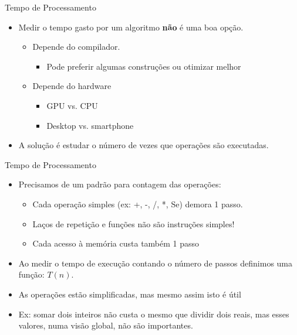 \documentclass[aspectratio=169]{beamer}
\begin{document}

\begin{frame}{Tempo de Processamento}
\begin{itemize}
\item Medir o tempo gasto por um algoritmo {\bf não} é uma boa opção.
\begin{itemize}
\item Depende do compilador. 
\begin{itemize}
\item Pode preferir algumas construções ou otimizar melhor
\end{itemize}
\item Depende do hardware
\begin{itemize}
\item GPU vs. CPU
\item Desktop vs. smartphone
\end{itemize}
\end{itemize}
\item A solução é estudar o número de vezes que operações são executadas.
\end{itemize}
\end{frame}


\begin{frame}{Tempo de Processamento}
\begin{itemize}
\item Precisamos de um padrão para contagem das operações:
\begin{itemize}
\item Cada operação simples (ex: +, -, /, *, Se) demora 1 passo.
\item Laços de repetição e funções não são instruções simples!
\item Cada acesso à memória custa também 1 passo
\end{itemize}
\item Ao medir o tempo de execução contando o número de passos definimos uma função: $T (n)$.
\item As operações estão simplificadas, mas mesmo assim isto é útil
\item Ex: somar dois inteiros não custa o mesmo que dividir dois reais, mas esses valores, numa visão global, não são importantes.
\end{itemize}
\end{frame}
\end{document}
